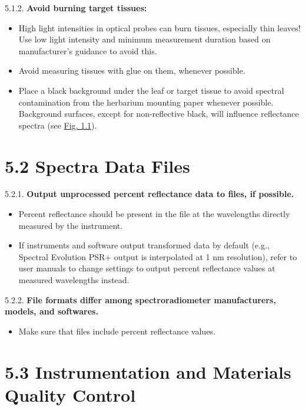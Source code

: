 \documentclass[
  letterpaper,
  DIV=11,
  numbers=noendperiod]{scrreprt}
\providecommand{\tightlist}{%
  \setlength{\itemsep}{0pt}\setlength{\parskip}{0pt}}
\begin{document}
5.1.2. \textbf{Avoid burning target tissues:}

\begin{itemize}
\tightlist
\item
  High light intensities in optical probes can burn tissues, especially
  thin leaves! Use low light intensity and minimum measurement duration
  based on manufacturer's guidance to avoid this.\\
\item
  Avoid measuring tissues with glue on them, whenever possible.\\
\item
  Place a black background under the leaf or target tissue to avoid
  spectral contamination from the herbarium mounting paper whenever
  possible. Background surfaces, except for non-reflective black, will
  influence reflectance spectra (see \hyperref[f1-1]{Fig. 1.1}).
\end{itemize}

\section{5.2 Spectra Data Files}\label{spectra-data-files}

5.2.1. \textbf{Output unprocessed percent reflectance data to files, if
possible.}

\begin{itemize}
\tightlist
\item
  Percent reflectance should be present in the file at the wavelengths
  directly measured by the instrument.\\
\item
  If instruments and software output transformed data by default (e.g.,
  Spectral Evolution PSR+ output is interpolated at 1 nm resolution),
  refer to user manuals to change settings to output percent reflectance
  values at measured wavelengths instead.
\end{itemize}

5.2.2. \textbf{File formats differ among spectroradiometer
manufacturers, models, and softwares.}

\begin{itemize}
\tightlist
\item
  Make sure that files include percent reflectance values.
\end{itemize}

\section{5.3 Instrumentation and Materials Quality
Control}\label{instrumentation-and-materials-quality-control}
\end{document}
